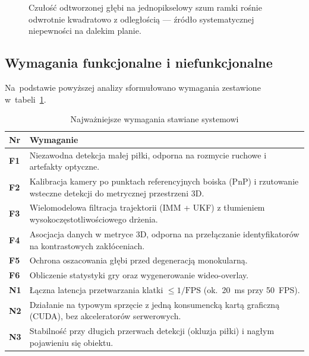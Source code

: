 \documentclass[14pt,a4paper]{extarticle}
\begin{document}
\begin{figure}[H]
\centering
{}
\caption{Czułość odtworzonej głębi na jednopikselowy szum ramki rośnie odwrotnie
  kwadratowo z odległością — źródło systematycznej niepewności na dalekim planie.}
\label{fig:depth}
\end{figure}

\subsection{Wymagania funkcjonalne i niefunkcjonalne}
Na~podstawie powyższej analizy sformułowano wymagania zestawione w~tabeli~\ref{tab:wym}.

\begin{table}[H]
\centering
\caption{Najważniejsze wymagania stawiane systemowi}
\label{tab:wym}
\renewcommand{\arraystretch}{1.25}
\footnotesize
\begin{tabularx}{\textwidth}{>{\bfseries}p{1.3cm} X}
\toprule
\rowcolor{vbHead}\textbf{Nr} & \textbf{Wymaganie} \\
\midrule
F1 & Niezawodna detekcja małej piłki, odporna na rozmycie ruchowe i artefakty optyczne. \\
F2 & Kalibracja kamery po punktach referencyjnych boiska (PnP) i rzutowanie wsteczne detekcji do metrycznej przestrzeni 3D. \\
F3 & Wielomodelowa filtracja trajektorii (IMM + UKF) z tłumieniem wysokoczęstotliwościowego drżenia. \\
F4 & Asocjacja danych w metryce 3D, odporna na przełączanie identyfikatorów na kontrastowych zakłóceniach. \\
F5 & Ochrona oszacowania głębi przed degeneracją monokularną. \\
F6 & Obliczenie statystyki gry oraz wygenerowanie wideo-overlay. \\
\midrule
N1 & Łączna latencja przetwarzania klatki $\le 1/\text{FPS}$ (ok.~20~ms przy 50~FPS). \\
N2 & Działanie na typowym sprzęcie z jedną konsumencką kartą graficzną (CUDA), bez akceleratorów serwerowych. \\
N3 & Stabilność przy długich przerwach detekcji (okluzja piłki) i nagłym pojawieniu się obiektu. \\
\bottomrule
\end{tabularx}
\end{table}
\end{document}
